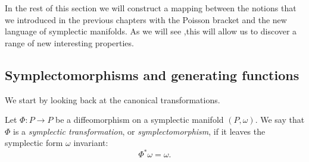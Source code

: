 \documentclass[english,fontsize=11pt,paper=b5]{scrbook}
\numberwithin{equation}{chapter}
\theoremstyle{definition}
\begin{document}
    In the rest of this section we will construct a mapping between the notions that we introduced in the previous chapters with the Poisson bracket and the new language of symplectic manifolds.
    As we will see ,this will allow us to discover a range of new interesting properties.

    \subsection{Symplectomorphisms and generating functions}

    We start by looking back at the canonical transformations.

    \begin{tcolorbox}
      Let $\Phi: P \to P$ be a diffeomorphism on a symplectic manifold $(P,\omega)$.
      We say that $\Phi$ is a \emph{symplectic transformation}, or \emph{symplectomorphism}, if it leaves the symplectic form $\omega$ invariant:
      \begin{equation}\label{eq:symplectomorphism}
        \Phi^* \omega = \omega.
      \end{equation}
    \end{tcolorbox}
\end{document}
